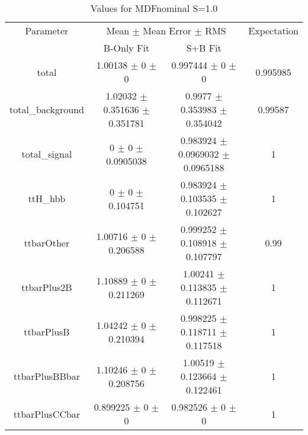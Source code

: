 \begin{table}
\centering
\caption{Values for MDFnominal S=1.0}
\begin{tabular}{cccc}
\toprule
Parameter & \multicolumn{2}{c}{Mean $\pm$ Mean Error $\pm$ RMS} & Expectation\\
 & B-Only Fit & S+B Fit & \\
\midrule
total & \num{1.00138} $\pm$ \num{0} $\pm$ \num{0} & \num{0.997444} $\pm$ \num{0} $\pm$ \num{0} & \num{0.995985}\\
total\_background & \num{1.02032} $\pm$ \num{0.351636} $\pm$ \num{0.351781} & \num{0.9977} $\pm$ \num{0.353983} $\pm$ \num{0.354042} & \num{0.99587}\\
total\_signal & \num{0} $\pm$ \num{0} $\pm$ \num{0.0905038} & \num{0.983924} $\pm$ \num{0.0969032} $\pm$ \num{0.0965188} & \num{1}\\
ttH\_hbb & \num{0} $\pm$ \num{0} $\pm$ \num{0.104751} & \num{0.983924} $\pm$ \num{0.103535} $\pm$ \num{0.102627} & \num{1}\\
ttbarOther & \num{1.00716} $\pm$ \num{0} $\pm$ \num{0.206588} & \num{0.999252} $\pm$ \num{0.108918} $\pm$ \num{0.107797} & \num{0.99}\\
ttbarPlus2B & \num{1.10889} $\pm$ \num{0} $\pm$ \num{0.211269} & \num{1.00241} $\pm$ \num{0.113835} $\pm$ \num{0.112671} & \num{1}\\
ttbarPlusB & \num{1.04242} $\pm$ \num{0} $\pm$ \num{0.210394} & \num{0.998225} $\pm$ \num{0.118711} $\pm$ \num{0.117518} & \num{1}\\
ttbarPlusBBbar & \num{1.10246} $\pm$ \num{0} $\pm$ \num{0.208756} & \num{1.00519} $\pm$ \num{0.123664} $\pm$ \num{0.122461} & \num{1}\\
ttbarPlusCCbar & \num{0.899225} $\pm$ \num{0} $\pm$ \num{0} & \num{0.982526} $\pm$ \num{0} $\pm$ \num{0} & \num{1}\\
\bottomrule
\end{tabular}
\end{table}